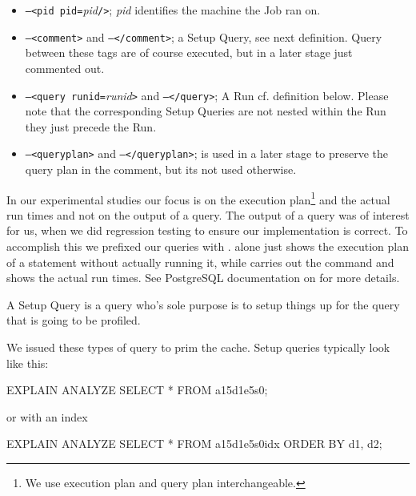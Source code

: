\begin{itemize}
\item 
\texttt{--<pid pid=}\textit{pid}\texttt{/>}; \textit{pid} identifies
the machine the Job ran on.

\item 
\texttt{--<comment>} and \texttt{--</comment>}; a Setup Query, see
next definition. Query between these tags are of course executed, but
in a later stage just commented out.

\item 
\texttt{--<query runid=}\textit{runid}\texttt{>} and
\texttt{--</query>}; A Run cf. definition below.  Please note that the
corresponding Setup Queries are not nested within the Run they just
precede the Run.

\item 
\texttt{--<queryplan>} and \texttt{--</queryplan>}; is used in a
later stage to preserve the query plan in the comment, but its not
used otherwise.
\end{itemize}

In our experimental studies our focus is on the execution
plan\footnote{We use execution plan and query plan interchangeable.}
and the actual run times and not on the output of a query. The output
of a query was of interest for us, when we did regression testing to
ensure our implementation is correct. To accomplish this we prefixed
our queries with . 
alone just shows the execution plan of a statement without actually
running it, while  carries out the command
and shows the actual run times. See PostgreSQL documentation on
 for more details.

\begin{definition}
A Setup Query is a query who's sole purpose is to setup things up for
the query that is going to be profiled.
\end{definition}

\noindent
We issued these types of query to prim the cache. Setup queries
typically look like this:

\begin{interactive}
EXPLAIN ANALYZE SELECT * FROM a15d1e5s0;
\end{interactive}

\noindent
or with an index

\begin{interactive}
EXPLAIN ANALYZE SELECT * FROM a15d1e5s0idx ORDER BY d1, d2;
\end{interactive}

